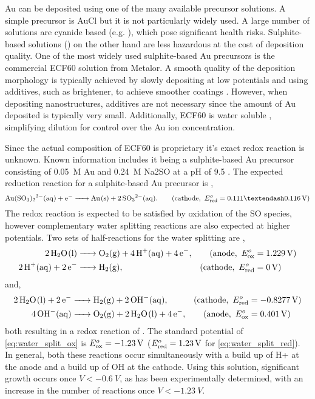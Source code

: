 \documentclass{article}
\begin{document}
Au can be deposited using one of the many available precursor solutions. A simple precursor is AuCl but it is not particularly widely used. A large number of solutions are cyanide based (e.g. ), which pose significant health risks. Sulphite-based solutions () on the other hand are less hazardous at the cost of deposition quality. One of the most widely used sulphite-based Au precursors is the commercial ECF60 solution from Metalor. A smooth quality of the deposition morphology is typically achieved by slowly depositing at low potentials and using additives, such as brightener, to achieve smoother coatings \cite{oniciu1991some}. However, when depositing nanostructures, additives are not necessary since the amount of Au deposited is typically very small. Additionally, ECF60 is water soluble \cite{roy2009electrochemical}, simplifying dilution for control over the Au ion concentration.

Since the actual composition of ECF60 is proprietary it's exact redox reaction is unknown. Known information includes it being a sulphite-based Au precursor consisting of \SI{0.05}{M} Au and \SI{0.24}{M} Na\subs2SO at a pH of 9.5 \cite{roy2009electrochemical}. The expected reduction reaction for a sulphite-based Au precursor is \cite{green2007gold},
\begin{equation}
	\ce{Au(SO3)2^{3-}(aq) + e- -> Au(s) + 2SO3^{2-}(aq)}. \qquad (\mathrm{cathode},\ \Ered=0.111\textendash\SI{0.116}{V})
\end{equation}
The redox reaction is expected to be satisfied by oxidation of the SO species, however complementary water splitting reactions are also expected at higher potentials. Two sets of half-reactions for the water splitting are \cite{haynes2013crc},
\begin{subequations}
\begin{align}
	\ce{2H2O(l) &-> O2(g) + 4H+(aq) + 4e-}, &(\mathrm{anode},\ \Eox&=\SI{1.229}{V}) \label{eq:water_split_ox} \\
	\ce{2H+(aq) + 2e- &-> H2(g)}, &(\mathrm{cathode},\ \Ered&=\SI{0}{V})
\end{align}
\end{subequations}
and,
\begin{subequations}
\begin{align}
	\ce{2H2O(l) + 2e- &-> H2(g) + 2OH^-(aq)}, &(\mathrm{cathode},\ \Ered&=\SI{-0.8277}{V}) \label{eq:water_split_red} \\
	\ce{4OH^-(aq) &-> O2(g) + 2H2O(l) + 4e-}, &(\mathrm{anode},\ \Eox&=\SI{0.401}{V})
\end{align}
\end{subequations}
both resulting in a redox reaction of . The standard potential of \eqref{eq:water_split_ox} is $E^o_{\mathrm{ox}}=\SI{-1.23}{V}$ ($E^o_{\mathrm{red}}=\SI{1.23}{V}$ for \eqref{eq:water_split_red}). In general, both these reactions occur simultaneously with a build up of H\sups+ at the anode and a build up of OH\sups{\textminus} at the cathode. %
Using this solution, significant growth occurs once $V<\SI{-0.6}{V}$, as has been experimentally determined, with an increase in the number of reactions once $V<\SI{-1.23}{V}$.
\end{document}
